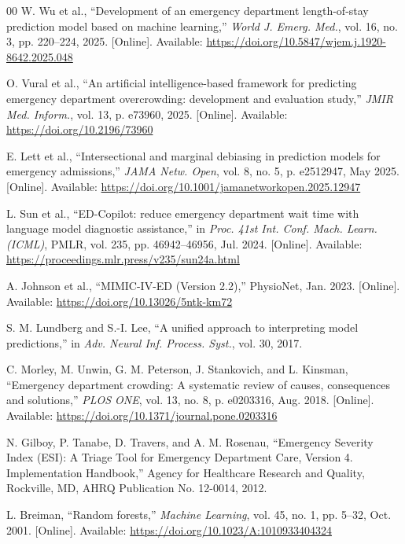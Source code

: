 \documentclass[conference]{IEEEtran}
\begin{document}
\begin{thebibliography}{00}
W. Wu et al., ``Development of an emergency department length-of-stay
prediction model based on machine learning,'' \textit{World J. Emerg. Med.},
vol. 16, no. 3, pp. 220--224, 2025. [Online]. Available:
\url{https://doi.org/10.5847/wjem.j.1920-8642.2025.048}

O. Vural et al., ``An artificial intelligence-based framework for predicting
emergency department overcrowding: development and evaluation study,''
\textit{JMIR Med. Inform.}, vol. 13, p. e73960, 2025. [Online]. Available:
\url{https://doi.org/10.2196/73960}

E. Lett et al., ``Intersectional and marginal debiasing in prediction models
for emergency admissions,'' \textit{JAMA Netw. Open}, vol. 8, no. 5,
p. e2512947, May 2025. [Online]. Available:
\url{https://doi.org/10.1001/jamanetworkopen.2025.12947}

L. Sun et al., ``ED-Copilot: reduce emergency department wait time with
language model diagnostic assistance,'' in \textit{Proc. 41st Int. Conf.
Mach. Learn. (ICML)}, PMLR, vol. 235, pp. 46942--46956, Jul. 2024. [Online].
Available: \url{https://proceedings.mlr.press/v235/sun24a.html}

A. Johnson et al., ``MIMIC-IV-ED (Version 2.2),'' PhysioNet, Jan. 2023.
[Online]. Available: \url{https://doi.org/10.13026/5ntk-km72}

S. M. Lundberg and S.-I. Lee, ``A unified approach to interpreting model
predictions,'' in \textit{Adv. Neural Inf. Process. Syst.}, vol. 30, 2017.


C. Morley, M. Unwin, G. M. Peterson, J. Stankovich, and L. Kinsman,
``Emergency department crowding: A systematic review of causes, consequences
and solutions,'' \textit{PLOS ONE}, vol. 13, no. 8, p. e0203316, Aug. 2018.
[Online]. Available: \url{https://doi.org/10.1371/journal.pone.0203316}

N. Gilboy, P. Tanabe, D. Travers, and A. M. Rosenau, ``Emergency Severity
Index (ESI): A Triage Tool for Emergency Department Care, Version 4.
Implementation Handbook,'' Agency for Healthcare Research and Quality,
Rockville, MD, AHRQ Publication No. 12-0014, 2012.

L. Breiman, ``Random forests,'' \textit{Machine Learning}, vol. 45, no. 1,
pp. 5--32, Oct. 2001. [Online]. Available:
\url{https://doi.org/10.1023/A:1010933404324}


\end{thebibliography}
\end{document}
